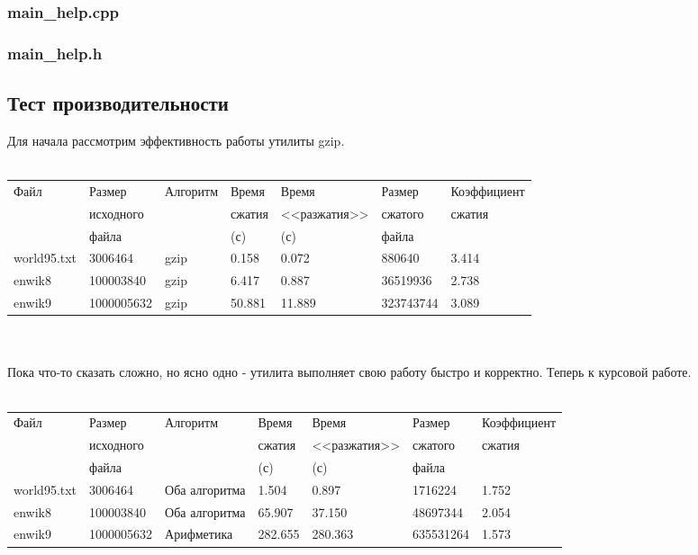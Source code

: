 \documentclass[12pt]{article}
\begin{document}
\subsubsection*{main\_help.cpp}

\subsubsection*{main\_help.h}

\subsection*{Тест производительности}

Для начала рассмотрим эффективность работы утилиты gzip.
\\
\\
\noindent
\begin{tabular}{| l | l | l | l | l | l | l |}
\hline
Файл         & Размер       & Алгоритм & Время  & Время        & Размер    & Коэффициент \\
             & исходного    &          & сжатия & <<разжатия>> & сжатого   & сжатия\\
             & файла &          & (с)    & (с)          & файла     & \\
 \hline
world95.txt  & 3006464      & gzip     & 0.158  & 0.072        & 880640    & 3.414\\       
 \hline
enwik8       & 100003840    & gzip     & 6.417  & 0.887        & 36519936  & 2.738\\
 \hline
enwik9       & 1000005632   & gzip     & 50.881 & 11.889       & 323743744 & 3.089\\
 \hline

 \hline
\end{tabular}
\\
\\
Пока что-то сказать сложно, но ясно одно - утилита выполняет свою работу быстро и корректно. Теперь к курсовой работе. 
\\
\\
\noindent
\begin{tabular}{| l | l | l | l | l | l | l |}
\hline
Файл         & Размер       & Алгоритм      & Время   & Время        & Размер       & Коэффициент \\
             & исходного    &               & сжатия  & <<разжатия>> & сжатого      & сжатия\\
             & файла &               & (с)     & (с)          & файла & \\
 \hline
world95.txt  & 3006464      & Оба алгоритма & 1.504   & 0.897        & 1716224      & 1.752\\       
 \hline
enwik8       & 100003840    & Оба алгоритма & 65.907  & 37.150       & 48697344     & 2.054\\
 \hline
enwik9       & 1000005632   & Арифметика    & 282.655 & 280.363      & 635531264    & 1.573\\
 \hline

 \hline
\end{tabular}
\\
\end{document}
